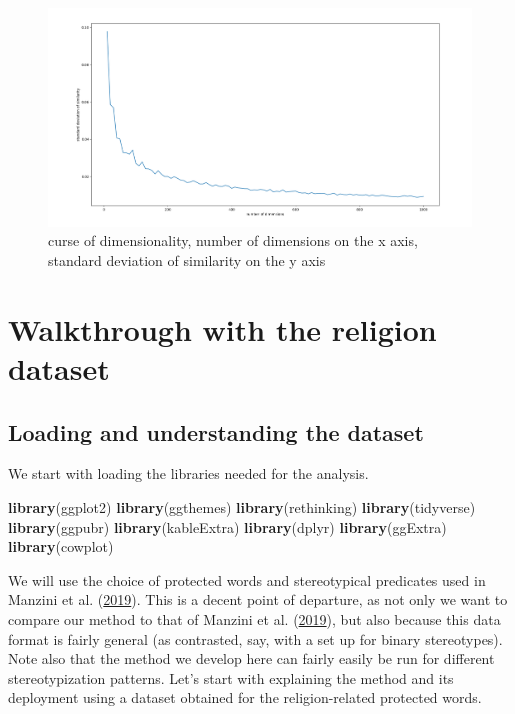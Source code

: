 \documentclass[12pt,]{book}
\newenvironment{Shaded}{\begin{snugshade}}{\end{snugshade}}
\newcommand{\KeywordTok}[1]{\textcolor[rgb]{0.13,0.29,0.53}{\textbf{#1}}}
\newcommand{\NormalTok}[1]{#1}
\begin{document}
\begin{figure}
\centering
\includegraphics{../images/curseOfDimensionality.png}
\caption{curse of dimensionality, number of dimensions on the x axis,
standard deviation of similarity on the y axis}
\end{figure}

\chapter{Walkthrough with the religion
dataset}\label{walkthrough-with-the-religion-dataset}

\section{Loading and understanding the
dataset}\label{loading-and-understanding-the-dataset}

We start with loading the libraries needed for the analysis.

\footnotesize

\begin{Shaded}
\begin{Highlighting}[]
\KeywordTok{library}\NormalTok{(ggplot2)}
\KeywordTok{library}\NormalTok{(ggthemes)}
\KeywordTok{library}\NormalTok{(rethinking)}
\KeywordTok{library}\NormalTok{(tidyverse)}
\KeywordTok{library}\NormalTok{(ggpubr)}
\KeywordTok{library}\NormalTok{(kableExtra)}
\KeywordTok{library}\NormalTok{(dplyr)}
\KeywordTok{library}\NormalTok{(ggExtra)}
\KeywordTok{library}\NormalTok{(cowplot)}
\end{Highlighting}
\end{Shaded}

\normalsize 

We will use the choice of protected words and stereotypical predicates
used in Manzini et al.
(\protect\hyperlink{ref-Manzini2019blackToCriminal}{2019}). This is a
decent point of departure, as not only we want to compare our method to
that of Manzini et al.
(\protect\hyperlink{ref-Manzini2019blackToCriminal}{2019}), but also
because this data format is fairly general (as contrasted, say, with a
set up for binary stereotypes). Note also that the method we develop
here can fairly easily be run for different stereotypization patterns.
Let's start with explaining the method and its deployment using a
dataset obtained for the religion-related protected words.
\end{document}
